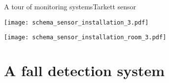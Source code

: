 \begin{frame}{A tour of monitoring systems}{Tarkett sensor}
\begin{minipage}[t]{0.64\linewidth}
    \begin{minipage}[b]{0.45\linewidth}
    \centering
    \texttt{[image: schema\_sensor\_installation\_3.pdf]}
    
    \end{minipage}
    \hfill
    \begin{minipage}[b]{0.54\linewidth}
    \centering
    \texttt{[image: schema\_sensor\_installation\_room\_3.pdf]}
    
    \end{minipage}
\end{minipage}

\end{frame}

\section{A fall detection system}
